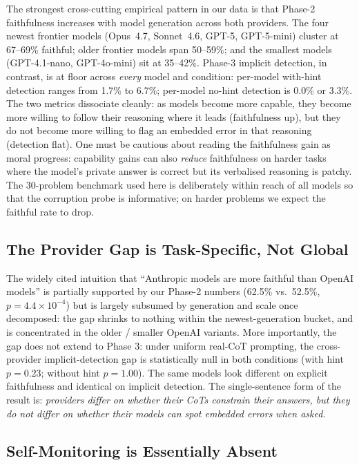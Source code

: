 \documentclass{article}
\begin{document}
The strongest cross-cutting empirical pattern in our data is that Phase-2 faithfulness increases with model generation across both providers. The four newest frontier models (Opus~4.7, Sonnet~4.6, GPT-5, GPT-5-mini) cluster at 67--69\% faithful; older frontier models span 50--59\%; and the smallest models (GPT-4.1-nano, GPT-4o-mini) sit at 35--42\%. Phase-3 implicit detection, in contrast, is at floor across \emph{every} model and condition: per-model with-hint detection ranges from 1.7\% to 6.7\%; per-model no-hint detection is 0.0\% or 3.3\%. The two metrics dissociate cleanly: as models become more capable, they become more willing to follow their reasoning where it leads (faithfulness up), but they do not become more willing to flag an embedded error in that reasoning (detection flat). One must be cautious about reading the faithfulness gain as moral progress: capability gains can also \emph{reduce} faithfulness on harder tasks where the model's private answer is correct but its verbalised reasoning is patchy. The 30-problem benchmark used here is deliberately within reach of all models so that the corruption probe is informative; on harder problems we expect the faithful rate to drop.

\subsection{The Provider Gap is Task-Specific, Not Global}

The widely cited intuition that ``Anthropic models are more faithful than OpenAI models'' is partially supported by our Phase-2 numbers (62.5\% vs.\ 52.5\%, $p=4.4\!\times\!10^{-4}$) but is largely subsumed by generation and scale once decomposed: the gap shrinks to nothing within the newest-generation bucket, and is concentrated in the older / smaller OpenAI variants. More importantly, the gap does not extend to Phase 3: under uniform real-CoT prompting, the cross-provider implicit-detection gap is statistically null in both conditions (with hint $p=0.23$; without hint $p=1.00$). The same models look different on explicit faithfulness and identical on implicit detection. The single-sentence form of the result is: \emph{providers differ on whether their CoTs constrain their answers, but they do not differ on whether their models can spot embedded errors when asked.}

\subsection{Self-Monitoring is Essentially Absent}
\end{document}
